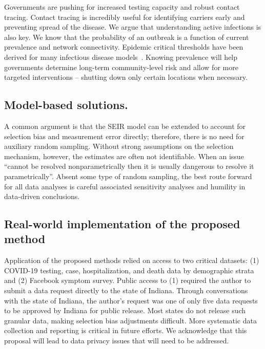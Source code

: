 \documentclass[11pt]{amsart}
\numberwithin{equation}{section}
\theoremstyle{plain}
\begin{document}
Governments are pushing for increased testing capacity and robust contact tracing.  Contact tracing is incredibly useful for identifying carriers early and preventing spread of the disease.  We argue that understanding active infections is also key.  We know that the probability of an outbreak is a function of current prevalence and network connectivity.  Epidemic critical thresholds have been derived for many infectious disease models~\citep{Pastor2001,Newman2002,Parshani2010}.  Knowing prevalence will help governments determine long-term community-level risk and allow for more targeted interventions -- shutting down only certain locations when necessary.

\subsection*{Model-based solutions.}

A common argument is that the SEIR model can be extended to account for selection bias and measurement error directly; therefore, there is no need for auxiliary random sampling.  Without strong assumptions on the selection mechanism, however, the estimates are often not identifiable.  When an issue ``cannot be resolved nonparametrically then it is usually dangerous to resolve it parametrically''\citep{CoxHink74}. Absent some type of random sampling, the best route forward for all data analyses is careful associated sensitivity analyses and humility in data-driven conclusions.


\subsection*{Real-world implementation of the proposed method}

Application of the proposed methods relied on access to two critical datasets: (1) COVID-19 testing, case, hospitalization, and death data by demographic strata and (2) Facebook symptom survey.  Public access to (1) required the author to submit a data request directly to the state of Indiana.  Through conversations with the state of Indiana, the author's request was one of only five data requests to be approved by Indiana for public release.  Most states do not release such granular data, making selection bias adjustments difficult.  More systematic data collection and reporting is critical in future efforts. We acknowledge that this proposal will lead to data privacy issues that will need to be addressed.
\end{document}
